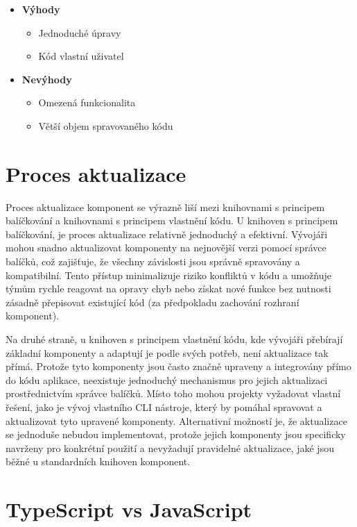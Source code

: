 \begin{itemize}
    \item \textbf{Výhody}
    \begin{itemize}
        \item Jednoduché úpravy
        \item Kód vlastní uživatel
    \end{itemize}
    \item \textbf{Nevýhody}
    \begin{itemize}
        \item Omezená funkcionalita
        \item Větší objem spravovaného kódu
    \end{itemize}
\end{itemize}

\section{Proces aktualizace}
Proces aktualizace komponent se výrazně liší mezi knihovnami s principem balíčkování a knihovnami s principem vlastnění kódu. U knihoven s principem balíčkování, je proces aktualizace relativně jednoduchý a efektivní. Vývojáři mohou snadno aktualizovat komponenty na nejnovější verzi pomocí správce balíčků, což zajišťuje, že všechny závislosti jsou správně spravovány a kompatibilní. Tento přístup minimalizuje riziko konfliktů v kódu a umožňuje týmům rychle reagovat na opravy chyb nebo získat nové funkce bez nutnosti zásadně přepisovat existující kód (za předpokladu zachování rozhraní komponent).

Na druhé straně, u knihoven s principem vlastnění kódu, kde vývojáři přebírají základní komponenty a adaptují je podle svých potřeb, není aktualizace tak přímá. Protože tyto komponenty jsou často značně upraveny a integrovány přímo do kódu aplikace, neexistuje jednoduchý mechanismus pro jejich aktualizaci prostřednictvím správce balíčků. Místo toho mohou projekty vyžadovat vlastní řešení, jako je vývoj vlastního CLI nástroje, který by pomáhal spravovat a aktualizovat tyto upravené komponenty. Alternativní možností je, že aktualizace se jednoduše nebudou implementovat, protože jejich komponenty jsou specificky navrženy pro konkrétní použití a nevyžadují pravidelné aktualizace, jaké jsou běžné u standardních knihoven komponent.

\section{TypeScript vs JavaScript}

